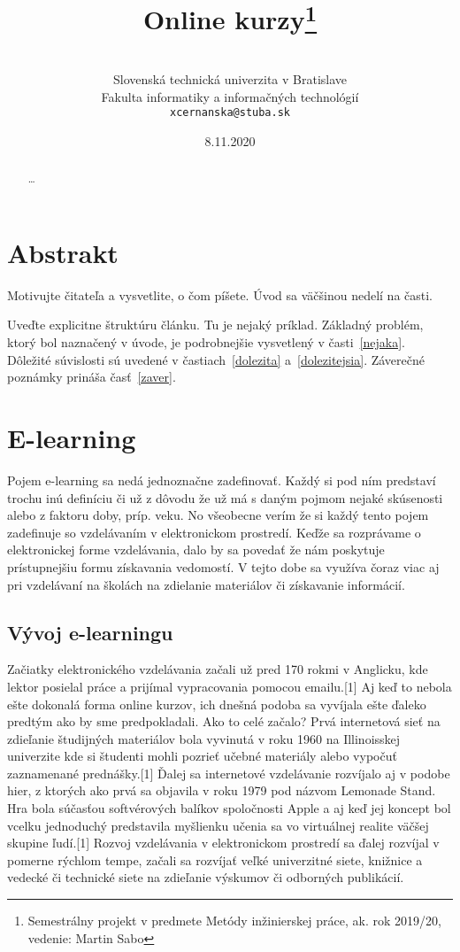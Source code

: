 \documentclass[10pt,twoside,slovak,a4paper]{article}
\title{Online kurzy\thanks{Semestrálny projekt v predmete Metódy inžinierskej práce, ak. rok 2019/20, vedenie: Martin Sabo}}
\author{\\[2pt]
	{\small Slovenská technická univerzita v Bratislave}\\
	{\small Fakulta informatiky a informačných technológií}\\
	{\small \texttt{xcernanska@stuba.sk}}
	}
\date{\small 8.11.2020}
\begin{document}
\maketitle

\begin{abstract}
\ldots
\end{abstract}



\section{Abstrakt}

Motivujte čitateľa a vysvetlite, o čom píšete. Úvod sa väčšinou nedelí na časti.

Uveďte explicitne štruktúru článku. Tu je nejaký príklad.
Základný problém, ktorý bol naznačený v úvode, je podrobnejšie vysvetlený v časti~\ref{nejaka}.
Dôležité súvislosti sú uvedené v častiach~\ref{dolezita} a~\ref{dolezitejsia}.
Záverečné poznámky prináša časť~\ref{zaver}.



\section{E-learning} \label{elearning}

Pojem e-learning sa nedá jednoznačne zadefinovať. Každý si pod ním predstaví trochu inú definíciu či už z dôvodu že už má s daným pojmom nejaké skúsenosti alebo z faktoru doby, príp. veku. No všeobecne verím že si každý tento pojem zadefinuje so vzdelávaním v elektronickom prostredí. Keďže sa rozprávame o elektronickej forme vzdelávania, dalo by sa povedať že nám poskytuje prístupnejšiu formu získavania vedomostí. V tejto dobe sa využíva čoraz viac aj pri vzdelávaní na školách na zdielanie materiálov či získavanie informácií.

\subsection{Vývoj e-learningu} \label{vyvoj}

Začiatky elektronického vzdelávania začali už pred 170 rokmi v Anglicku, kde lektor posielal práce a prijímal vypracovania pomocou emailu.[1] Aj keď to nebola ešte dokonalá forma online kurzov, ich dnešná podoba sa vyvíjala ešte ďaleko predtým ako by sme predpokladali. 
Ako to celé začalo?
Prvá internetová sieť na zdieľanie študijných materiálov bola vyvinutá v roku 1960 na Illinoisskej univerzite kde si študenti mohli pozrieť učebné materiály alebo vypočuť zaznamenané prednášky.[1]
Ďalej sa internetové vzdelávanie rozvíjalo aj v podobe hier, z ktorých ako prvá sa objavila v roku 1979 pod názvom Lemonade Stand. Hra bola súčasťou softvérových balíkov spoločnosti Apple a aj keď jej koncept bol vcelku jednoduchý predstavila myšlienku učenia sa vo virtuálnej realite väčšej skupine ľudí.[1]
Rozvoj vzdelávania v elektronickom prostredí sa ďalej rozvíjal v pomerne rýchlom tempe, začali sa rozvíjať veľké univerzitné siete, knižnice a vedecké či technické siete na zdieľanie výskumov či odborných publikácií.
\end{document}
